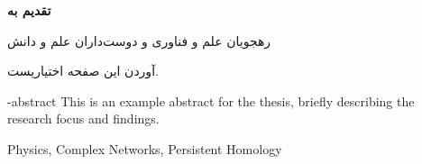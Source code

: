 \documentclass[msc]{style/SBU-Thesis}
\begin{document}
\rightsPage %
\copyRightPage %


{
	\newpage
	\thispagestyle{plain}
	\large{\textbf{تقدیم به}}
	
	\begin{center}
		رهجويان علم و فناوری و دوست‌داران علم و دانش
	\end{center}
	
	\vspace{14cm}	
	آوردن این صفحه اختیاریست.
	
	\pagebreak
}


\abstractPage

\tableofcontents 

\listoffigures \newpage 

\listoftables \newpage 

\prefacePage
		
\setcounter{page}{1}
{\baselineskip=1cm
}
\let\cleardoublepage\clearpage
{\baselineskip=1cm
}
\let\cleardoublepage\clearpage
{\baselineskip=1cm
}
\let\cleardoublepage\clearpage
{\baselineskip=1cm
}
\let\cleardoublepage\clearpage

\appendix
{}


\cleardoublepage

\newpage
\renewcommand{\bibname}{مراجع}



\en-abstract
{
This is an example abstract for the thesis, briefly describing the research focus and findings.
}

\latinkeywords
{
    Physics, Complex Networks, Persistent Homology
}

\latinAbstractPage 

\latinFirstPage 
\end{document}
